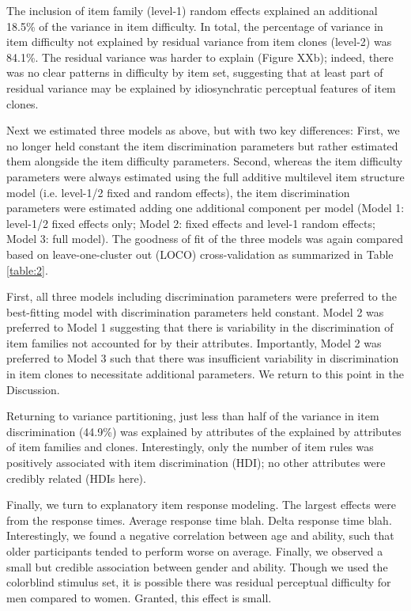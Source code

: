 \documentclass[a4paper,man,natbib]{apa6}
\begin{document}
The inclusion of item family (level-1) random effects explained an additional 18.5\% of the variance in item difficulty. In total, the percentage of variance in item difficulty not explained by residual variance from item clones (level-2) was 84.1\%. The residual variance was harder to explain (Figure XXb); indeed, there was no clear patterns in difficulty by item set, suggesting that at least part of residual variance may be explained by idiosynchratic perceptual features of item clones. 

Next we estimated three models as above, but with two key differences: First, we no longer held constant the item discrimination parameters but rather estimated them alongside the item difficulty parameters. Second, whereas the item difficulty parameters were always estimated using the full additive multilevel item structure model (i.e. level-1/2 fixed and random effects), the item discrimination parameters were estimated adding one additional component per model (Model 1: level-1/2 fixed effects only; Model 2: fixed effects and level-1 random effects; Model 3: full model). The goodness of fit of the three models was again compared based on leave-one-cluster out (LOCO) cross-validation as summarized in Table \ref{table:2}. 

First, all three models including discrimination parameters were preferred to the best-fitting model with discrimination parameters held constant. Model 2 was preferred to Model 1 suggesting that there is variability in the discrimination of item families not accounted for by their attributes. Importantly, Model 2 was preferred to Model 3 such that there was insufficient variability in discrimination in item clones to necessitate additional parameters. We return to this point in the Discussion.

Returning to variance partitioning, just less than half of the variance in item discrimination (44.9\%) was explained by attributes of the explained by attributes of item families and clones. Interestingly, only the number of item rules was positively associated with item discrimination (HDI); no other attributes were credibly related (HDIs here). 

Finally, we turn to explanatory item response modeling. The largest effects were from the response times. Average response time blah. Delta response time blah. Interestingly, we found a negative correlation between age and ability, such that older participants tended to perform worse on average. Finally, we observed a small but credible association between gender and ability. Though we used the colorblind stimulus set, it is possible there was residual perceptual difficulty for men compared to women. Granted, this effect is small.
\end{document}
